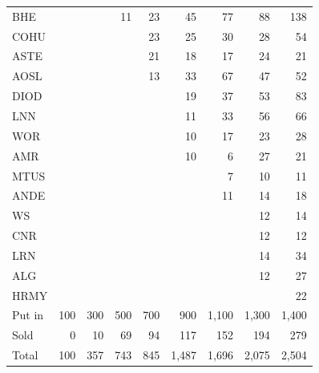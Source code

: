 \documentclass[11pt,a4paper]{article}
\begin{document}
{\begin{longtable}{l r r r r r r r r }
BHE &  &  & 11 & 23 & 45 & 77 & 88 & 138 \\
COHU &  &  &  & 23 & 25 & 30 & 28 & 54 \\
ASTE &  &  &  & 21 & 18 & 17 & 24 & 21 \\
AOSL &  &  &  & 13 & 33 & 67 & 47 & 52 \\
DIOD &  &  &  &  & 19 & 37 & 53 & 83 \\
LNN &  &  &  &  & 11 & 33 & 56 & 66 \\
WOR &  &  &  &  & 10 & 17 & 23 & 28 \\
AMR &  &  &  &  & 10 & 6 & 27 & 21 \\
MTUS &  &  &  &  &  & 7 & 10 & 11 \\
ANDE &  &  &  &  &  & 11 & 14 & 18 \\
WS &  &  &  &  &  &  & 12 & 14 \\
CNR &  &  &  &  &  &  & 12 & 12 \\
LRN &  &  &  &  &  &  & 14 & 34 \\
ALG &  &  &  &  &  &  & 12 & 27 \\
HRMY &  &  &  &  &  &  &  & 22 \\
\hline
Put in & 100 & 300 & 500 & 700 & 900 & 1,100 & 1,300 & 1,400 \\
Sold & 0 & 10 & 69 & 94 & 117 & 152 & 194 & 279 \\
Total & 100 & 357 & 743 & 845 & 1,487 & 1,696 & 2,075 & 2,504 \\
\hline
\end{longtable}}
\end{document}
